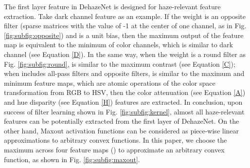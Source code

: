 \documentclass[journal]{IEEEtran}
\begin{document}
The first layer feature  in DehazeNet is designed for haze-relevant feature extraction. Take dark channel feature \cite{dcp} as an example. If the weight  is an opposite filter (sparse matrices with the value of -1 at the center of one channel, as in Fig. \ref{fig:subfig:opposite}) and  is a unit bias, then the maximum output of the feature map is equivalent to the minimum of color channels, which is similar to dark channel \cite{dcp} (see Equation \eqref{D}). In the same way, when the weight is a round filter as Fig. \ref{fig:subfig:round},  is similar to the maximum contrast \cite{maxcontrast} (see Equation \eqref{C}); when  includes all-pass filters and opposite filters,  is similar to the maximum and minimum feature maps, which are atomic operations of the color space transformation from RGB to HSV, then the color attenuation \cite{cap} (see Equation \eqref{A}) and hue disparity \cite{semiinverse} (see Equation \eqref{H}) features are extracted. In conclusion, upon success of filter learning shown in Fig. \ref{fig:subfig:kernel}, almost all haze-relevant features can be potentially extracted from the first layer of DehazeNet. On the other hand, Maxout activation functions can be considered as piece-wise linear approximations to arbitrary convex functions. In this paper, we choose the maximum across four feature maps () to approximate an arbitrary convex function, as shown in Fig. \ref{fig:subfig:maxout}.
\end{document}
